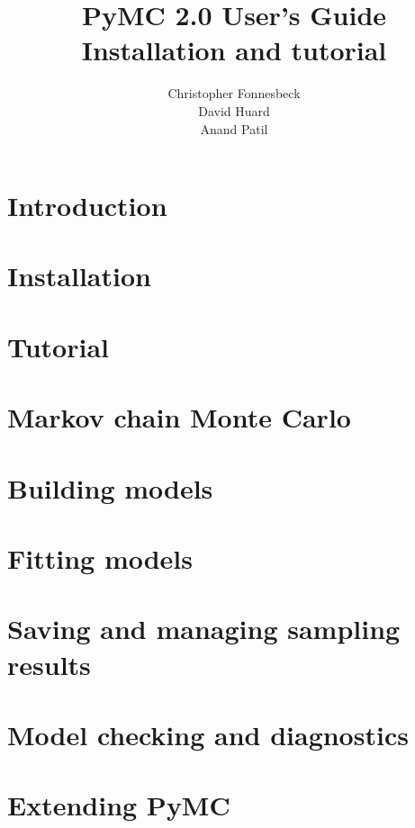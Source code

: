 \documentclass[]{manual}
\title{PyMC 2.0 User's Guide \\
Installation and tutorial}
\author{ Christopher Fonnesbeck\\ David Huard \\ Anand Patil }
\begin{document}
\maketitle

\tableofcontents

\chapter{Introduction} 
\label{chap:intro} 


\chapter{Installation} 
\label{chap:install} 


\chapter{Tutorial}
\label{chap:tutorial}


\chapter{Markov chain Monte Carlo} 
\label{chap:MCMC} 


\chapter{Building models}
\label{chap:modelbuilding} 


\chapter{Fitting models}
\label{chap:modelfitting}


\chapter{Saving and managing sampling results}
\label{chap:database} 


\chapter{Model checking and diagnostics} 
\label{chap:diagnostics}


\chapter{Extending PyMC}
\label{chap:extending}

\end{document}
